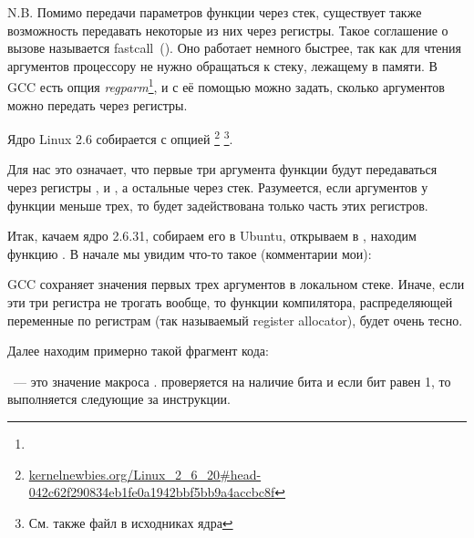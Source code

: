 \label{regparm}
N.B. Помимо передачи параметров функции через стек, существует также возможность передавать 
некоторые из них через регистры. Такое соглашение о вызове называется fastcall~().
Оно работает немного быстрее, так как для чтения аргументов процессору не нужно обращаться к стеку, лежащему в памяти. 
В GCC есть опция \emph{regparm}\footnote{\URLREGPARM}, 
и с её помощью можно задать, сколько аргументов можно передать через регистры.

\newcommand{\URLKERNELNEWB}{\href{http://kernelnewbies.org/Linux_2_6_20\#head-042c62f290834eb1fe0a1942bbf5bb9a4accbc8f}{kernelnewbies.org/Linux\_2\_6\_20\#head-042c62f290834eb1fe0a1942bbf5bb9a4accbc8f}}
\newcommand{\CALLINGHFILE}{arch/x86/include/asm/calling.h}

Ядро Linux 2.6 собирается с опцией \footnote{\URLKERNELNEWB}
\footnote{См. также файл \TT{\CALLINGHFILE} в исходниках ядра}.

Для нас это означает, что первые три аргумента функции будут передаваться через регистры \EAX, \EDX и \ECX, 
а остальные через стек. Разумеется, если аргументов у функции меньше трех, то будет задействована 
только часть этих регистров.

Итак, качаем ядро 2.6.31, собираем его в Ubuntu, открываем в \IDA, 
находим функцию . В начале мы увидим что-то такое (комментарии мои):



GCC сохраняет значения первых трех аргументов в локальном стеке. Иначе, если эти три регистра 
не трогать вообще, то функции компилятора, распределяющей переменные по регистрам (так называемый 
\gls{register allocator}), будет очень тесно.

Далее находим примерно такой фрагмент кода:



~--- это значение макроса . 
 проверяется на наличие бита  и если бит равен 1, то выполняется следующие 
за \JNZ инструкции.
